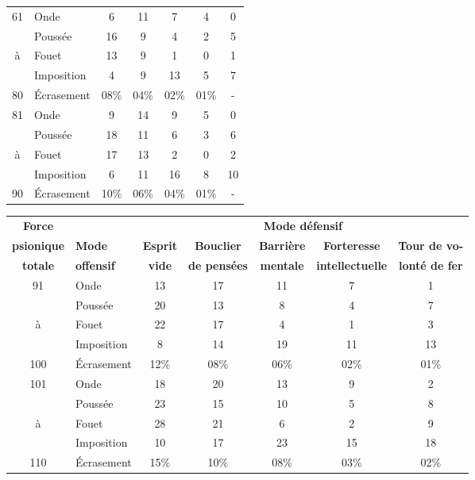 \documentclass[11pt]{article}
\begin{document}
{\begin{tabular}{clccccc}
61 & Onde       &    6 & 11   & 7    & 4    & 0 \\
   & Poussée    &   16 & 9    & 4    & 2    & 5 \\
à  & Fouet      &   13 & 9    & 1    & 0    & 1 \\
   & Imposition &    4 & 9    & 13   & 5    & 7 \\
80 & Écrasement & 08\% & 04\% & 02\% & 01\% & - \\

81 & Onde       &    9 & 14   & 9    & 5    & 0  \\
   & Poussée    &   18 & 11   & 6    & 3    & 6  \\
à  & Fouet      &   17 & 13   & 2    & 0    & 2  \\
   & Imposition &    6 & 11   & 16   & 8    & 10 \\
90 & Écrasement & 10\% & 06\% & 04\% & 01\% & -  \\
\end{tabular}

\begin{tabular}{clccccc}
\small\textbf{Force} & & \multicolumn{5}{c}{\small\textbf{Mode défensif}} \\
\small\textbf{psionique} & \small\textbf{Mode} & \small\textbf{Esprit} & \small\textbf{Bouclier} & \small\textbf{Barrière} & \small\textbf{Forteresse} & \small\textbf{Tour de vo-} \\
\small\textbf{totale} & \small\textbf{offensif} & \small\textbf{vide} & \small\textbf{de pensées} & \small\textbf{mentale} & \small\textbf{intellectuelle} & \small\textbf{lonté de fer} \\

91  & Onde       &   13 & 17   & 11   & 7    & 1    \\
    & Poussée    &   20 & 13   & 8    & 4    & 7    \\
à   & Fouet      &   22 & 17   & 4    & 1    & 3    \\
    & Imposition &    8 & 14   & 19   & 11   & 13   \\
100 & Écrasement & 12\% & 08\% & 06\% & 02\% & 01\% \\

101 & Onde       &   18 & 20   & 13   & 9    & 2    \\
    & Poussée    &   23 & 15   & 10   & 5    & 8    \\
à   & Fouet      &   28 & 21   & 6    & 2    & 9\footnotemark \\
    & Imposition &   10 & 17   & 23   & 15   & 18   \\
110 & Écrasement & 15\% & 10\% & 08\% & 03\% & 02\% \\


\end{tabular}}
\end{document}
